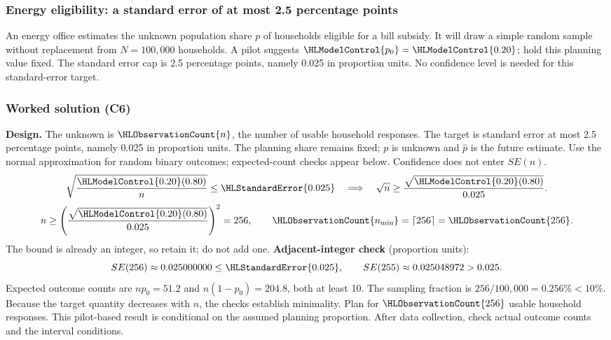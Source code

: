 \subsubsection{Energy eligibility: a standard error of at most 2.5 percentage points}\label{prob:t1-prop}
An energy office estimates the unknown population share $p$ of households eligible for a bill subsidy. It will draw a simple random sample without replacement from $N=100{,}000$ households. A pilot suggests $\HLModelControl{p_0}=\HLModelControl{0.20}$; hold this planning value fixed. The standard error cap is 2.5 percentage points, namely 0.025 in proportion units. No confidence level is needed for this standard-error target. 
\subsubsection*{Worked solution (C6)}\label{sol:t1-prop}
\textbf{Design.} The unknown is $\HLObservationCount{n}$, the number of usable household responses. The target is standard error at most 2.5 percentage points, namely 0.025 in proportion units. The planning share remains fixed; $p$ is unknown and $\hat p$ is the future estimate. Use the normal approximation for random binary outcomes; expected-count checks appear below. Confidence does not enter $SE(n)$. 
\[
\sqrt{\frac{\HLModelControl{0.20}(0.80)}{n}}\le \HLStandardError{0.025}\quad\Longrightarrow\quad\sqrt n\ge\frac{\sqrt{\HLModelControl{0.20}(0.80)}}{0.025}.
\]
\[n\ge\left(\frac{\sqrt{\HLModelControl{0.20}(0.80)}}{0.025}\right)^2=256,\qquad \HLObservationCount{n_{\min}}=\left\lceil 256\right\rceil=\HLObservationCount{256}.\]
The bound is already an integer, so retain it; do not add one.
\textbf{Adjacent-integer check} (proportion units):
\[ SE(256)\approx0.025000000\le \HLStandardError{0.025},\qquad SE(255)\approx0.025048972>0.025.\]
Expected outcome counts are $np_0=51.2$ and $n(1-p_0)=204.8$, both at least 10. The sampling fraction is $256/100{,}000=0.256\%<10\%$. Because the target quantity decreases with $n$, the checks establish minimality. Plan for $\HLObservationCount{256}$ usable household responses. This pilot-based result is conditional on the assumed planning proportion. After data collection, check actual outcome counts and the interval conditions. 

